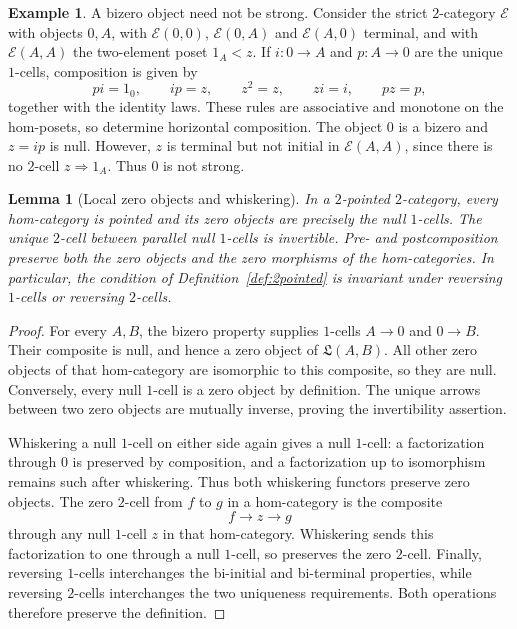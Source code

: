 \documentclass[11pt,reqno,a4paper]{amsart}
\newtheorem{lemma}[theorem]{Lemma}
\theoremstyle{definition}
\newtheorem{example}[theorem]{Example}
\theoremstyle{remark}
\newcommand{\0}{\mathbf{0}}
\renewcommand{\1}{\mathbf{1}}
\newcommand{\Lcat}{\mathfrak L}
\begin{document}
\begin{example}\label{ex:bizero-not-strong}
A bizero object need not be strong. Consider the strict
$2$-category $\mathcal E$ with objects $0,A$, with
$\mathcal E(0,0)$, $\mathcal E(0,A)$ and $\mathcal E(A,0)$
terminal, and with $\mathcal E(A,A)$ the two-element poset
$1_A<z$. If $i:0\to A$ and $p:A\to0$ are the unique
$1$-cells, composition is given by
\[
 pi=1_0,\qquad ip=z,\qquad z^2=z,
 \qquad zi=i,\qquad pz=p,
\]
together with the identity laws. These rules are associative
and monotone on the hom-posets, so determine horizontal
composition. The object $0$ is a bizero and $z=ip$ is null.
However, $z$ is terminal but not initial in
$\mathcal E(A,A)$, since there is no $2$-cell $z\Rightarrow1_A$.
Thus $0$ is not strong.
\end{example}

\begin{lemma}[Local zero objects and whiskering]\label{lem:localpointedness}
In a $2$-pointed $2$-category, every hom-category is pointed and its
zero objects are precisely the null $1$-cells. The unique $2$-cell
between parallel null $1$-cells is invertible. Pre- and postcomposition
preserve both the zero objects and the zero morphisms of the
hom-categories. In particular, the condition of
Definition~\ref{def:2pointed} is invariant under reversing $1$-cells
or reversing $2$-cells.
\end{lemma}
\begin{proof}
For every $A,B$, the bizero property supplies $1$-cells $A\to0$ and
$0\to B$. Their composite is null, and hence a zero object of
$\Lcat(A,B)$. All other zero objects of that hom-category are
isomorphic to this composite, so they are null. Conversely, every
null $1$-cell is a zero object by definition. The unique arrows
between two zero objects are mutually inverse, proving the
invertibility assertion.

Whiskering a null $1$-cell on either side again gives a null
$1$-cell: a factorization through $0$ is preserved by composition,
and a factorization up to isomorphism remains such after whiskering.
Thus both whiskering functors preserve zero objects. The zero
$2$-cell from $f$ to $g$ in a hom-category is the composite
\[
 f\longrightarrow z\longrightarrow g
\]
through any null $1$-cell $z$ in that hom-category. Whiskering sends
this factorization to one through a null $1$-cell, so preserves the
zero $2$-cell. Finally, reversing $1$-cells interchanges the
bi-initial and bi-terminal properties, while reversing $2$-cells
interchanges the two uniqueness requirements. Both operations
therefore preserve the definition.
\end{proof}
\end{document}
